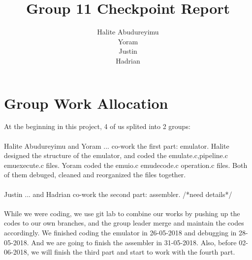 \documentclass[a4paper]{article}
\title{Group 11 Checkpoint Report}
\author{Halite Abudureyimu\\Yoram\\Justin\\Hadrian}
\begin{document}
\maketitle

\section{Group Work Allocation}
At the beginning in this project, 4 of us splited into 2 groups:\\ \\
Halite Abudureyimu and Yoram ... co-work the first part: emulator. Halite designed the structure of the emulator, and coded the emulate.c,pipeline.c emuexecute.c files. Yoram coded the emuio.c emudecode.c operation.c files. Both of them debuged, cleaned and reorganized the files together.
\\\\
Justin ... and Hadrian co-work the second part: assembler. /*need details*/
\\\\

While we were coding, we use git lab to combine our works by pushing up the codes to our own branches, and the group leader merge and maintain the codes accordingly. We finished coding the emulator in 26-05-2018 and debugging in 28-05-2018. And we are going to finish the assembler in 31-05-2018. Also, before 02-06-2018, we will finish the third part and start to work with the fourth part.
\end{document}

